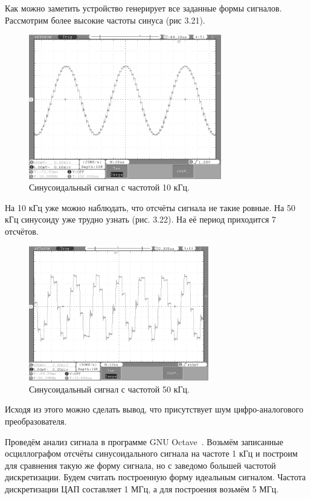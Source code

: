 	Как можно заметить устройство генерирует все заданные формы сигналов. Рассмотрим более высокие частоты синуса (рис 3.21).
	
	\begin{figure}[H]
    \centering
    \includegraphics[width=0.75\textwidth]{../image/sin10.bmp}
    \caption{Синусоидальный сигнал с частотой 10 кГц.}
	\end{figure}	
	
	На 10 кГц уже можно наблюдать, что отсчёты сигнала не такие ровные. На 50 кГц синусоиду уже трудно узнать (рис. 3.22). На её период приходится 7 отсчётов.
	
	\begin{figure}[H]
    \centering
    \includegraphics[width=0.7\textwidth]{../image/sin50.bmp}
    \caption{Синусоидальный сигнал с частотой 50 кГц.}
	\end{figure}	
	
	Исходя из этого можно сделать вывод, что присутствует шум цифро-аналогового преобразователя. 
	
	Проведём анализ сигнала в программе GNU Octave~\cite{octave}. Возьмём записанные осциллографом отсчёты синусоидального сигнала на частоте 1 кГц и построим для сравнения такую же форму сигнала, но с заведомо большей частотой дискретизации. Будем считать построенную форму идеальным сигналом. Частота дискретизации ЦАП составляет 1 МГц, а для построения возьмём 5 МГц.
	
